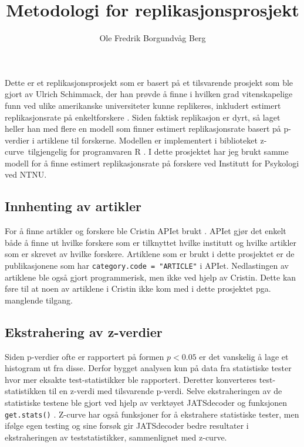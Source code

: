 \documentclass[doc,norsk]{apa7}
\title{Metodologi for replikasjonsprosjekt}
\author{Ole Fredrik Borgundvåg Berg}
\affiliation{NTNU}
\begin{document}
\maketitle

Dette er et replikasjonsprosjekt som er basert på et tilsvarende prosjekt som ble gjort av Ulrich Schimmack, der han prøvde å finne i hvilken grad vitenskapelige funn ved ulike amerikanske universiteter kunne replikeres, inkludert estimert replikasjonsrate på enkeltforskere \parencite{amerikansk-ranking}. Siden faktisk replikasjon er dyrt, så laget heller han med flere en modell som finner estimert replikasjonsrate basert på p-verdier i artiklene til forskerne. Modellen er implementert i biblioteket \guillemetleft z-curve\guillemetright\ tilgjengelig for programvaren R \parencite{z-curve-modell, z-curve-implementasjon}. I dette prosjektet har jeg brukt samme modell for å finne estimert replikasjonsrate på forskere ved Institutt for Psykologi ved NTNU.

\subsection{Innhenting av artikler}
For å finne artikler og forskere ble Cristin APIet brukt \parencite{cristin-api}. APIet gjør det enkelt både å finne ut hvilke forskere som er tilknyttet hvilke institutt og hvilke artikler som er skrevet av hvilke forskere. Artiklene som er brukt i dette prosjektet er de publikasjonene som har \texttt{category.code = "ARTICLE"} i APIet. Nedlastingen av artiklene ble også gjort programmerisk, men ikke ved hjelp av Cristin. Dette kan føre til at noen av artiklene i Cristin ikke kom med i dette prosjektet pga. manglende tilgang.

\subsection{Ekstrahering av z-verdier}
Siden p-verdier ofte er rapportert på formen $p < 0.05$ er det vanskelig å lage et histogram ut fra disse. Derfor bygget analysen kun på data fra statistiske tester hvor mer eksakte test-statistikker ble rapportert. Deretter konverteres test-statistikken til en z-verdi med tilsvarende p-verdi. Selve ekstraheringen av de statistiske testene ble gjort ved hjelp av verktøyet JATSdecoder og funksjonen \texttt{get.stats()} \parencite{jatsdecoder}. Z-curve har også funksjoner for å ekstrahere statistiske tester, men ifølge egen testing og \textcite{jatsdecoder} sine forsøk gir JATSdecoder bedre resultater i ekstraheringen av teststatistikker, sammenlignet med z-curve.
\end{document}
